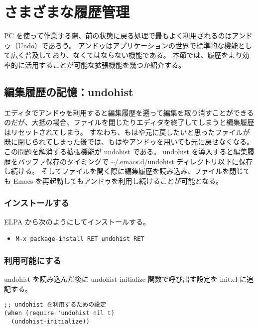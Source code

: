 \section{さまざまな履歴管理}
PC を使って作業する際、前の状態に戻る処理で最もよく利用されるのはアンドゥ（Undo）であろう。
アンドゥはアプリケーションの世界で標準的な機能として広く普及しており、なくてはならない機能である。
本節では、履歴をより効率的に活用することが可能な拡張機能を幾つか紹介する。
\subsection{編集履歴の記憶：undohist}
エディタでアンドゥを利用すると編集履歴を遡って編集を取り消すことができるのだが、大抵の場合、ファイルを閉じたりエディタを終了してしまうと編集履歴はリセットされてしまう。
すなわち、もはや元に戻したいと思ったファイルが既に閉じられてしまった後では、もはやアンドゥを用いても元に戻せなくなる。
この問題を解消する拡張機能が undohist である。
undohist を導入すると編集履歴をバッファ保存のタイミングで \textasciitilde{}/.emacs.d/undohist ディレクトリ以下に保存し続ける。
そしてファイルを開く際に編集履歴を読み込み、ファイルを閉じても Emacs を再起動してもアンドゥを利用し続けることが可能となる。
\subsubsection{インストールする}
ELPA から次のようにしてインストールする。
\begin{itemize}\setlength{\leftskip}{-1.00zw}%
\item[] \texttt{M-x package-install RET undohist RET}
\end{itemize}
\subsubsection{利用可能にする}
undohist を読み込んだ後に undohist-initialize 関数で呼び出す設定を init.el に追記する。
\begin{mdframed}[roundcorner=0.50zw,leftmargin=3.00zw,rightmargin=3.00zw,skipabove=0.40zw,skipbelow=0.40zw,innertopmargin=4.00pt,innerbottommargin=4.00pt,innerleftmargin=5.00pt,innerrightmargin=5.00pt,linecolor=gray!020,linewidth=0.50pt,backgroundcolor=gray!20]
\begin{verbatim}
;; undohist を利用するための設定
(when (require 'undohist nil t)
  (undohist-initialize))
\end{verbatim}
\end{mdframed}
